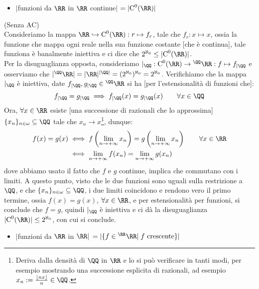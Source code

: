 \documentclass[11pt]{scrartcl}
\begin{document}
\begin{itemize}
	\item $|$funzioni da $\RR$ in $\RR$ continue$|$ $= |\text{C}^0(\RR)|$
\end{itemize}

\begin{soln}
	(Senza AC)\\
	Consideriamo la mappa $\RR \hookrightarrow \text C^0(\RR) : r \mapsto f_r$, tale che $f_r : x \mapsto x$, ossia la funzione che mappa ogni reale nella sua funzione costante [che è continua], tale funziona è banalmente iniettiva
	e ci dice che $2^{\aleph_0} \leq |\text C^0(\RR)|$.\\
	Per la disuguaglianza opposta, consideriamo $|_\QQ : \text C^0(\RR) \rightarrow {}^\QQ \RR : f \mapsto f_{|\QQ}$ e osserviamo che $|{}^\QQ \RR| = |\RR|^{|\QQ|} = (2^{\aleph_0})^{\aleph_0} = 2^{\aleph_0}$. Verifichiamo che la mappa $|_{\QQ}$ è iniettiva,
	date $f_{|\QQ},g_{|\QQ} \in {}^{\QQ}\RR$ si ha [per l'estensionalità di funzioni che]:
	\[ f_{|\QQ} = g_{|\QQ} \implies f_{|\QQ}(x) = g_{|\QQ}(x) \qquad \forall x \in \QQ 
		\]
	Ora, $\forall x \in \RR$ esiste [una successione di razionali che lo approssima] $\{x_n\}_{n\in \omega} \subseteq \QQ$ tale che $x_n \to x$\footnote{Deriva dalla densità di $\QQ$ in $\RR$ e lo si può verificare in tanti modi,
	per esempio mostrando una successione esplicita di razionali, ad esempio $x_n := \frac{\left\lfloor nx\right\rfloor}{n} \in \QQ$.}, dunque:
	\[ \begin{split}
		f(x) = g(x) &\iff f\left(\lim_{n \to +\infty} x_n\right) = g\left(\lim_{n \to +\infty} x_n\right) \qquad \forall x \in \RR \\
					&\iff \lim_{n \to +\infty} f(x_n) = \lim_{n \to +\infty} g(x_n)
	\end{split}
		\]
	dove abbiamo usato il fatto che $f$ e $g$ continue, implica che commutano con i limiti. A questo punto, visto che le due funzioni sono uguali sulla restrizione a $\QQ$, e che $\{x_n\}_{n \in \omega} \subseteq \QQ$,
	i due limiti coincidono e rendono vero il primo termine, ossia $f(x) = g(x)$, $\forall x \in \RR$,
	e per estensionalità per funzioni, si conclude che $f = g$, quindi $|_{\QQ}$ è iniettiva e ci dà la disuguaglianza $|\text C^0(\RR)| \leq 2^{\aleph_0}$, con cui si conclude.
\end{soln}

\begin{itemize}
	\item $|$funzioni da $\RR$ in $\RR|$ $= |\{f \in {}^\RR \RR | \; \text{$f$ crescente}\}|$
\end{itemize}
\end{document}
